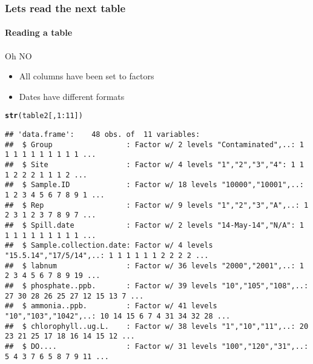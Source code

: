 \documentclass{article}\usepackage[]{graphicx}\usepackage[]{color}
\makeatletter
\newcommand{\hlnum}[1]{\textcolor[rgb]{0.686,0.059,0.569}{#1}}%
\newcommand{\hlopt}[1]{\textcolor[rgb]{0,0,0}{#1}}%
\newcommand{\hlstd}[1]{\textcolor[rgb]{0.345,0.345,0.345}{#1}}%
\newcommand{\hlkwd}[1]{\textcolor[rgb]{0.737,0.353,0.396}{\textbf{#1}}}%
\newenvironment{kframe}{%
 \def\at@end@of@kframe{}%
 \ifinner\ifhmode%
  \def\at@end@of@kframe{\end{minipage}}%
  \begin{minipage}{\columnwidth}%
 \fi\fi%
 \def\FrameCommand##1{\hskip\@totalleftmargin \hskip-\fboxsep
 \colorbox{shadecolor}{##1}\hskip-\fboxsep
     \hskip-\linewidth \hskip-\@totalleftmargin \hskip\columnwidth}%
 \MakeFramed {\advance\hsize-\width
   \@totalleftmargin\z@ \linewidth\hsize
   \@setminipage}}%
 {\par\unskip\endMakeFramed%
 \at@end@of@kframe}
\newenvironment{knitrout}{}{} %
\makeatother
\begin{document}
\begin{frame}[fragile]
  \frametitle{Lets read the next table}
  \framesubtitle{Reading a table}
  \begin{alert}{Oh NO}
\begin{itemize}  
\item All columns have been set to factors
\item Dates have different formats
\end{itemize}
\end{alert}
\begin{knitrout}
\color{fgcolor}\begin{kframe}
\begin{alltt}
\hlkwd{str}\hlstd{(table2[,}\hlnum{1}\hlopt{:}\hlnum{11}\hlstd{])}
\end{alltt}
\begin{verbatim}
## 'data.frame':	48 obs. of  11 variables:
##  $ Group                 : Factor w/ 2 levels "Contaminated",..: 1 1 1 1 1 1 1 1 1 1 ...
##  $ Site                  : Factor w/ 4 levels "1","2","3","4": 1 1 1 2 2 2 1 1 1 2 ...
##  $ Sample.ID             : Factor w/ 18 levels "10000","10001",..: 1 2 3 4 5 6 7 8 9 1 ...
##  $ Rep                   : Factor w/ 9 levels "1","2","3","A",..: 1 2 3 1 2 3 7 8 9 7 ...
##  $ Spill.date            : Factor w/ 2 levels "14-May-14","N/A": 1 1 1 1 1 1 1 1 1 1 ...
##  $ Sample.collection.date: Factor w/ 4 levels "15.5.14","17/5/14",..: 1 1 1 1 1 1 2 2 2 2 ...
##  $ labnum                : Factor w/ 36 levels "2000","2001",..: 1 2 3 4 5 6 7 8 9 19 ...
##  $ phosphate..ppb.       : Factor w/ 39 levels "10","105","108",..: 27 30 28 26 25 27 12 15 13 7 ...
##  $ ammonia..ppb.         : Factor w/ 41 levels "10","103","1042",..: 10 14 15 6 7 4 31 34 32 28 ...
##  $ chlorophyll..ug.L.    : Factor w/ 38 levels "1","10","11",..: 20 23 21 25 17 18 16 14 15 12 ...
##  $ DO....                : Factor w/ 31 levels "100","120","31",..: 5 4 3 7 6 5 8 7 9 11 ...
\end{verbatim}
\end{kframe}
\end{knitrout}



\end{frame}
\end{document}
